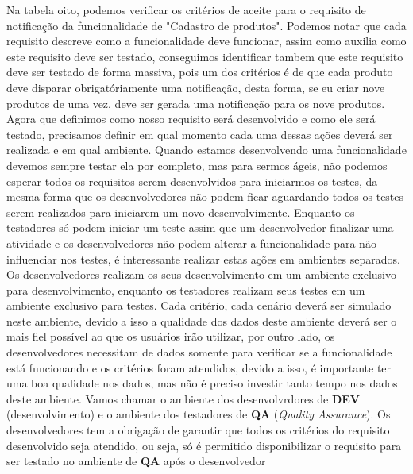       Na tabela oito, podemos verificar os critérios de aceite para o requisito de
      notificação da funcionalidade de "Cadastro de produtos". Podemos notar que cada
      requisito descreve como a funcionalidade deve funcionar, assim como auxilia
      como este requisito deve ser testado, conseguimos identificar tambem que este
      requisito deve ser testado de forma massiva, pois um dos critérios é de que
      cada produto deve disparar obrigatóriamente uma notificação, desta forma, se
      eu criar nove produtos de uma vez, deve ser gerada uma notificação para os
      nove produtos. \newline
      Agora que definimos como nosso requisito será desenvolvido e como ele será
      testado, precisamos definir em qual momento cada uma dessas ações deverá ser
      realizada e em qual ambiente. Quando estamos desenvolvendo uma funcionalidade
      devemos sempre testar ela por completo, mas para sermos ágeis, não podemos
      esperar todos os requisitos serem desenvolvidos para iniciarmos os testes,
      da mesma forma que os desenvolvedores não podem ficar aguardando todos os
      testes serem realizados para iniciarem um novo desenvolvimente. Enquanto os
      testadores só podem iniciar um teste assim que um desenvolvedor finalizar
      uma atividade e os desenvolvedores não podem alterar a funcionalidade para não
      influenciar nos testes, é interessante realizar estas ações em ambientes
      separados. Os desenvolvedores realizam os seus desenvolvimento em um ambiente
      exclusivo para desenvolvimento, enquanto os testadores realizam seus testes
      em um ambiente exclusivo para testes. Cada critério, cada cenário deverá ser
      simulado neste ambiente, devido a isso a qualidade dos dados deste ambiente
      deverá ser o mais fiel possível ao que os usuários irão utilizar, por outro
      lado, os desenvolvedores necessitam de dados somente para verificar se a
      funcionalidade está funcionando e os critérios foram atendidos, devido a isso,
      é importante ter uma boa qualidade nos dados, mas não é preciso investir
      tanto tempo nos dados deste ambiente. Vamos chamar o ambiente dos desenvolvrdores
      de \textbf{DEV} (desenvolvimento) e o ambiente dos testadores de \textbf{QA}
      (\textit{Quality Assurance}). \newline
      Os desenvolvedores tem a obrigação de garantir que todos os critérios do
      requisito desenvolvido seja atendido, ou seja, só é permitido disponibilizar
      o requisito para ser testado no ambiente de \textbf{QA} após o desenvolvedor
